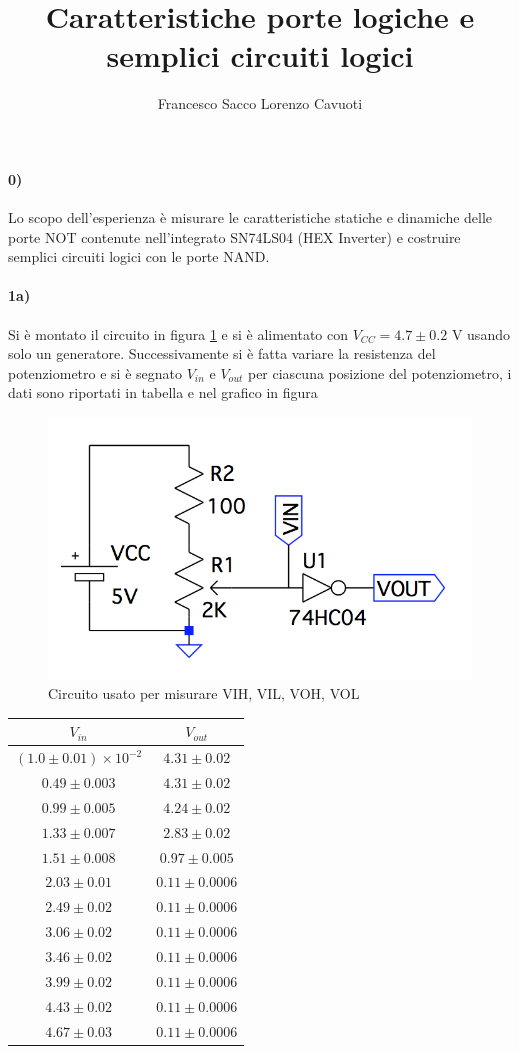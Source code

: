 \documentclass{article}
\date{}
\author{Francesco Sacco Lorenzo Cavuoti}
\title{Caratteristiche porte logiche e semplici circuiti logici}
\begin{document}
	\maketitle
	\paragraph{0)}
	Lo scopo dell'esperienza è misurare le caratteristiche statiche e dinamiche delle porte NOT contenute nell’integrato SN74LS04 (HEX Inverter) e costruire semplici circuiti logici con le porte NAND.
	
	\paragraph{1a)}
	Si è montato il circuito in figura \ref{fig:circuito-1} e si è alimentato con $V_{CC}=4.7\pm0.2$ V usando solo un generatore. Successivamente si è fatta variare la resistenza del potenziometro e si è segnato $V_{in}$ e $V_{out}$ per ciascuna posizione del potenziometro, i dati sono riportati in tabella e nel grafico in figura
	
	
\begin{figure}
	\includegraphics[width=0.8\linewidth]{figure/circuito1}
	\caption{Circuito usato per misurare VIH, VIL, VOH, VOL}
	\label{fig:circuito-1}
\end{figure}

\begin{table}
	\begin{tabular}{cc}
		\hline
		$V_{in}$ & $V_{out}$ \\
		\hline
		$(1.0\pm0.01)\times 10^{-2}$ & $4.31\pm0.02$ \\
		$0.49\pm0.003$ & $4.31\pm0.02$ \\
		$0.99\pm0.005$ & $4.24\pm0.02$ \\
		$1.33\pm0.007$ & $2.83\pm0.02$ \\
		$1.51\pm0.008$ & $0.97\pm0.005$ \\
		$2.03\pm0.01$ & $0.11\pm0.0006$ \\
		$2.49\pm0.02$ & $0.11\pm0.0006$ \\
		$3.06\pm0.02$ & $0.11\pm0.0006$ \\
		$3.46\pm0.02$ & $0.11\pm0.0006$ \\
		$3.99\pm0.02$ & $0.11\pm0.0006$ \\
		$4.43\pm0.02$ & $0.11\pm0.0006$ \\
		$4.67\pm0.03$ & $0.11\pm0.0006$ \\
		\hline
	\end{tabular}
\end{table}
\end{document}
